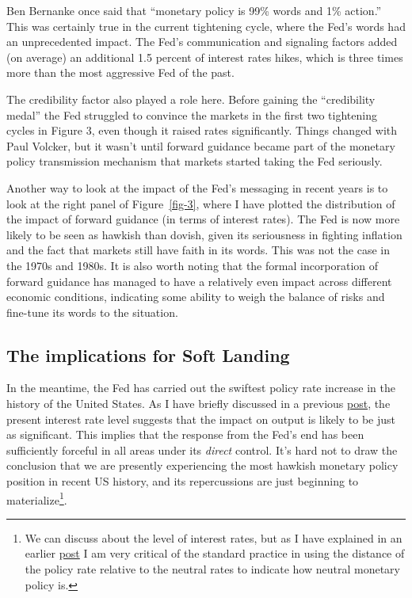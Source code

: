 \documentclass[
  letterpaper,
  DIV=11,
  numbers=noendperiod]{scrartcl}
\begin{document}
Ben Bernanke once said that ``monetary policy is 99\% words and 1\%
action.'' This was certainly true in the current tightening cycle, where
the Fed's words had an unprecedented impact. The Fed's communication and
signaling factors added (on average) an additional 1.5 percent of
interest rates hikes, which is three times more than the most aggressive
Fed of the past.

The credibility factor also played a role here. Before gaining the
``credibility medal'' the Fed struggled to convince the markets in the
first two tightening cycles in Figure 3, even though it raised rates
significantly. Things changed with Paul Volcker, but it wasn't until
forward guidance became part of the monetary policy transmission
mechanism that markets started taking the Fed seriously.

Another way to look at the impact of the Fed's messaging in recent years
is to look at the right panel of Figure~\ref{fig-3}, where I have
plotted the distribution of the impact of forward guidance (in terms of
interest rates). The Fed is now more likely to be seen as hawkish than
dovish, given its seriousness in fighting inflation and the fact that
markets still have faith in its words. This was not the case in the
1970s and 1980s. It is also worth noting that the formal incorporation
of forward guidance has managed to have a relatively even impact across
different economic conditions, indicating some ability to weigh the
balance of risks and fine-tune its words to the situation.

\hypertarget{the-implications-for-soft-landing}{%
\subsection{The implications for Soft
Landing}\label{the-implications-for-soft-landing}}

In the meantime, the Fed has carried out the swiftest policy rate
increase in the history of the United States. As I have briefly
discussed in a previous
\href{https://msh855.github.io/TheQuantEconomist/posts/fed_and_private_consumption/the_fed_and_private_consumption.html}{post},
the present interest rate level suggests that the impact on output is
likely to be just as significant. This implies that the response from
the Fed's end has been sufficiently forceful in all areas under its
\emph{direct} control. It's hard not to draw the conclusion that we are
presently experiencing the most hawkish monetary policy position in
recent US history, and its repercussions are just beginning to
materialize\footnote{We can discuss about the level of interest rates,
  but as I have explained in an earlier
  \href{https://msh855.github.io/TheQuantEconomist/posts/fed_and_private_consumption/the_fed_and_private_consumption.html}{post}
  I am very critical of the standard practice in using the distance of
  the policy rate relative to the neutral rates to indicate how neutral
  monetary policy is.}.
\end{document}
